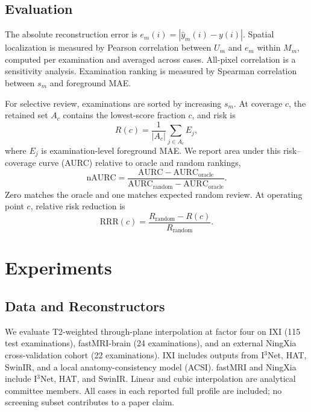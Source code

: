 \documentclass[twocolumn]{article}
\begin{document}
\subsection{Evaluation}

The absolute reconstruction error is $e_m(i)=|\hat y_m(i)-y(i)|$. Spatial localization is measured by Pearson correlation between $U_m$ and $e_m$ within $M_m$, computed per examination and averaged across cases. All-pixel correlation is a sensitivity analysis. Examination ranking is measured by Spearman correlation between $s_m$ and foreground MAE.

For selective review, examinations are sorted by increasing $s_m$. At coverage $c$, the retained set $A_c$ contains the lowest-score fraction $c$, and risk is
\begin{equation}
 R(c)=\frac{1}{|A_c|}\sum_{j\in A_c} E_j,
\end{equation}
where $E_j$ is examination-level foreground MAE. We report area under this risk--coverage curve (AURC) relative to oracle and random rankings,
\begin{equation}
 \mathrm{nAURC}=\frac{\mathrm{AURC}-\mathrm{AURC}_{\mathrm{oracle}}}
 {\mathrm{AURC}_{\mathrm{random}}-\mathrm{AURC}_{\mathrm{oracle}}}.
 \label{eq:naurc}
\end{equation}
Zero matches the oracle and one matches expected random review. At operating point $c$, relative risk reduction is
\begin{equation}
 \mathrm{RRR}(c)=\frac{R_{\mathrm{random}}-R(c)}{R_{\mathrm{random}}}.
\end{equation}

\section{Experiments}

\subsection{Data and Reconstructors}

We evaluate T2-weighted through-plane interpolation at factor four on IXI \citep{ixi} (115 test examinations), fastMRI-brain \citep{zbontar2018fastmri} (24 examinations), and an external NingXia cross-validation cohort (22 examinations). IXI includes outputs from I$^3$Net, HAT, SwinIR, and a local anatomy-consistency model (ACSI). fastMRI and NingXia include I$^3$Net, HAT, and SwinIR. Linear and cubic interpolation are analytical committee members. All cases in each reported full profile are included; no screening subset contributes to a paper claim.
\end{document}
